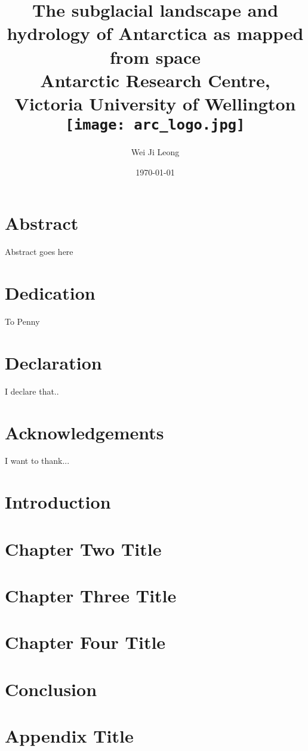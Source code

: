 \documentclass[12pt,twoside]{book}
\title{
{The subglacial landscape and hydrology of Antarctica as mapped from space}\\
{\large Antarctic Research Centre, Victoria University of Wellington}\\
{\texttt{[image: arc\_logo.jpg]}}
}
\author{Wei Ji Leong}
\date{\today}
\begin{document}


\chapter*{Abstract}
Abstract goes here

\chapter*{Dedication}
To Penny

\chapter*{Declaration}
I declare that..

\chapter*{Acknowledgements}
I want to thank...

\tableofcontents
\listoffigures
\listoftables

\printnoidxglossary[type=symbols,sort=use,style=long,title={List of Symbols}]
\printglossary[type=\acronymtype]

\chapter{Introduction}


\chapter{Chapter Two Title}


\chapter{Chapter Three Title}


\chapter{Chapter Four Title}


\chapter{Conclusion}


\appendix
\chapter{Appendix Title}


\printbibliography
\end{document}
